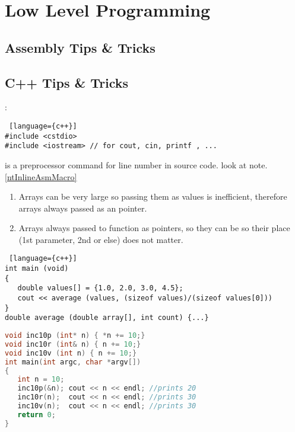 \chapter{Low Level Programming}
\section{Assembly Tips \& Tricks}
\section{C++ Tips \& Tricks}
\begin{note}:\\
\begin{lstlisting} [language={c++}]
#include <cstdio>
#include <iostream> // for cout, cin, printf , ...
\end{lstlisting}
\end{note}

\begin{note}[\_\_Line\_\_ ] is a preprocessor command for line number in source code. look at note.\ref{ntInlineAsmMacro}
\end{note}

\begin{note}
\begin{enumerate}
	\item Arrays can be very large so passing them as values is inefficient, therefore arrays always passed as an pointer.
	\item Arrays always passed to function as pointers, so they can be so their place (1st parameter, 2nd or else) does not matter.
\end{enumerate}
\begin{lstlisting} [language={c++}]
int main (void) 
{
   double values[] = {1.0, 2.0, 3.0, 4.5};
   cout << average (values, (sizeof values)/(sizeof values[0]))
}
double average (double array[], int count) {...}
\end{lstlisting}
\end{note}

\begin{note}
\begin{lstlisting}[language={c++}]
void inc10p (int* n) { *n += 10;}
void inc10r (int& n) { n += 10;}
void inc10v (int n) { n += 10;}
int main(int argc, char *argv[])
{
   int n = 10;
   inc10p(&n); cout << n << endl; //prints 20
   inc10r(n);  cout << n << endl; //prints 30
   inc10v(n);  cout << n << endl; //prints 30
   return 0;
}
\end{lstlisting}
\end{note}

